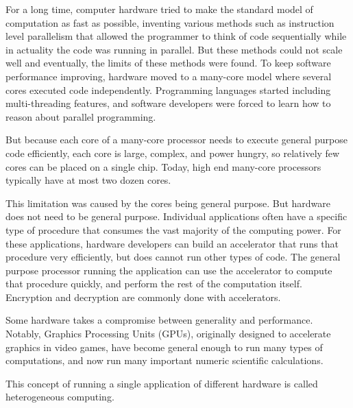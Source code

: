 \documentclass[12pt,twoside]{reedthesis}
\begin{document}
		
		
		For a long time, computer hardware tried to make the standard model of computation as fast as possible, inventing various methods such as instruction level parallelism that allowed the programmer to think of code sequentially while in actuality the code was running in parallel.
		But these methods could not scale well and eventually, the limits of these methods were found. To keep software performance improving, hardware moved to a many-core model where several cores executed code independently. Programming languages started including multi-threading features, and software developers were forced to learn how to reason about parallel programming. 
		
		But because each core of a many-core processor needs to execute general purpose code efficiently, each core is large, complex, and power hungry, so relatively few cores can be placed on a single chip. Today, high end many-core processors typically have at most two dozen cores. 
		
		This limitation was caused by the cores being general purpose. But hardware does not need to be general purpose. 
		Individual applications often have a specific type of procedure that consumes the vast majority of the computing power. For these applications, hardware developers can build an accelerator that runs that procedure very efficiently, but does cannot run other types of code. The general purpose processor running the application can use the accelerator to compute that procedure quickly, and perform the rest of the computation itself. Encryption and decryption are commonly done with accelerators. 
		
		Some hardware takes a compromise between generality and performance. Notably, Graphics Processing Units (GPUs), originally designed to accelerate graphics in video games, have become general enough to run many types of computations, and now run many important numeric scientific calculations. 
		
		This concept of running a single application of different hardware is called heterogeneous computing. 
		
		
\end{document}
